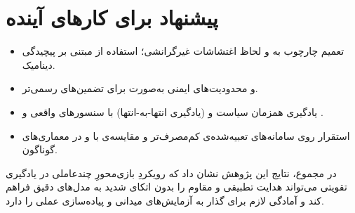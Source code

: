 \section*{پیشنهاد برای کارهای آینده}
\begin{itemize}
  \item تعمیم چارچوب به  و لحاظ اغتشاشات غیرگرانشی؛ استفاده از  مبتنی بر پیچیدگی دینامیک.
  \item {} و محدودیت‌های ایمنی به‌صورت  برای تضمین‌های رسمی‌تر.
  \item یادگیری همزمان سیاست و  (یادگیری انتها-به-انتها) با سنسورهای واقعی و .
  \item استقرار روی سامانه‌های تعبیه‌شده‌ی کم‌مصرف‌تر و مقایسه‌ی  با  و  در معماری‌های گوناگون.
\end{itemize}

\vspace{0.5em}
در مجموع، نتایج این پژوهش نشان داد که رویکردِ بازی‌محورِ چندعاملی در یادگیری تقویتی می‌تواند هدایت تطبیقی و مقاوم را بدون اتکای شدید به مدل‌های دقیق فراهم کند و آمادگی لازم برای گذار به آزمایش‌های میدانی و پیاده‌سازی عملی را دارد.

